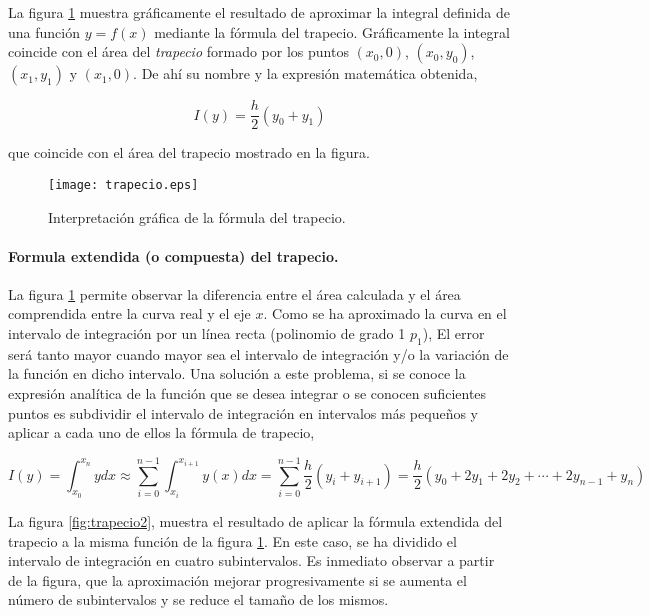 La figura \ref{fig:trapecio} muestra gráficamente el resultado de aproximar la integral definida de una función $y=f(x)$ mediante la fórmula del trapecio. Gráficamente la integral coincide con el área del \emph{trapecio} formado por los puntos $(x_0,0)$, $(x_0,y_0)$, $(x_1,y_1)$ y $(x_1,0)$.  De ahí su nombre y la expresión matemática obtenida,

\begin{equation*}
I(y)=\frac{h}{2}(y_0+y_1)
\end{equation*}

que coincide con el área del trapecio mostrado en la figura.
\begin{figure}[h]
\centering
\texttt{[image: trapecio.eps]}
\caption{Interpretación gráfica de la fórmula del trapecio.} 
\label{fig:trapecio}
\end{figure}

\paragraph*{Formula extendida (o compuesta) del trapecio.} La figura \ref{fig:trapecio} permite observar la diferencia entre el área calculada y el área comprendida entre la curva real y el eje $x$. Como se ha aproximado  la curva en el intervalo de integración por un línea recta (polinomio de grado 1 $p_1$), El error será tanto mayor cuando mayor sea el intervalo de integración y/o la variación de la función en dicho intervalo. Una solución a este problema, si se conoce la expresión analítica de la función que  se desea integrar o se conocen suficientes puntos es subdividir el intervalo de integración en intervalos más pequeños y aplicar a cada uno de ellos la fórmula de trapecio,

\begin{equation*}
I(y)=\int_{x_0}^{x_n}ydx \approx \sum_{i=0}^{n-1}\int_{x_i}^{x_{i+1}}y(x)dx=\sum_{i=0}^{n-1}\frac{h}{2}(y_i+y_{i+1})=\frac{h}{2}\left(y_0+2y_1+2y_2+\cdots+2y_{n-1}+y_n \right)
\end{equation*}

La figura \ref{fig:trapecio2}, muestra el resultado de aplicar la fórmula extendida del trapecio a la misma función de la figura \ref{fig:trapecio}. En este caso, se ha dividido el intervalo de integración en cuatro subintervalos. Es inmediato observar a partir de la figura, que la aproximación mejorar progresivamente si se aumenta el número de subintervalos y se reduce el tamaño de los mismos.


